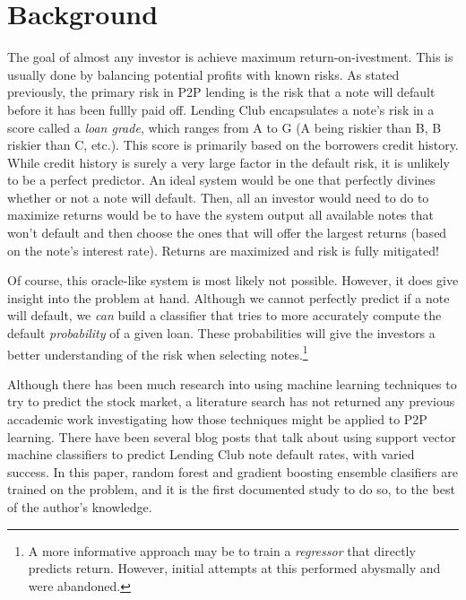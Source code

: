 \section{Background}
\label{background}
The goal of almost any investor is achieve maximum return-on-ivestment. This is usually done by balancing potential profits 
with known risks. As stated previously, the primary risk in P2P lending is the risk that a note will default before it has 
been fullly paid off. Lending Club encapsulates a note's risk in a score called a \emph{loan grade}, which ranges from A to G
(A being riskier than B, B riskier than C, etc.). This score is primarily based on the borrowers credit history. While credit 
history is surely a very large factor in the default risk, it is unlikely to be a perfect predictor. An ideal system would 
be one that perfectly divines whether or not a note will default. Then, all an investor would need to do to maximize returns 
would be to have the system output all available notes that won't default and then choose the ones that will offer the 
largest returns (based on the note's interest rate). Returns are maximized and risk is fully mitigated!

Of course, this oracle-like system is most likely not possible. However, it does give insight into the problem at hand. Although 
we cannot perfectly predict if a note will default, we \emph{can} build a classifier that tries to more accurately compute the 
default \emph{probability} of a given loan. These probabilities will give the investors a better understanding of the risk 
when selecting notes.\footnote{A more informative approach may be to train a \emph{regressor} that directly predicts return. 
However, initial attempts at this performed abysmally and were abandoned.}

Although there has been much research into using machine learning techniques to try to predict the stock market, 
a literature search has not returned any previous accademic work investigating how those techniques might be applied 
to P2P learning. There have been several blog posts\cite{superfacts, smartpeerlending} that talk about using support 
vector machine classifiers to predict Lending Club note default rates, with varied success. In this paper, 
random forest and gradient boosting ensemble clasifiers are trained on the problem, and it is the first documented 
study to do so, to the best of the author's knowledge.
